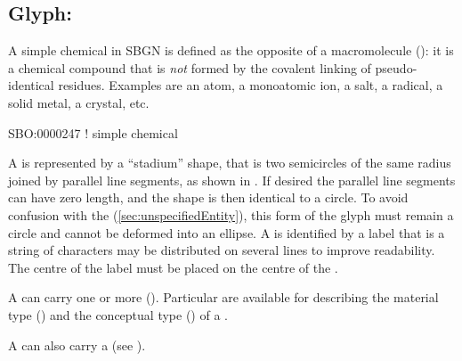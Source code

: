 \subsection{Glyph: }
\label{sec:simpleChemical}

A simple chemical in SBGN is defined as the opposite of a macromolecule (): it is a chemical compound that is \emph{not} formed by the covalent linking of pseudo-identical residues. 
Examples  are an atom, a monoatomic ion, a salt, a radical, a solid metal, a crystal, etc.

\begin{glyphDescription}

\glyphSboTerm
SBO:0000247 ! simple chemical



\glyphContainer
A  is represented by a ``stadium'' shape, that is two semicircles of the same radius joined by parallel line segments, as shown in .
If desired the parallel line segments can have zero length, and the shape is then identical to a circle.
To avoid confusion with the  (\ref{sec:unspecifiedEntity}), this form of the glyph must remain a circle and cannot be deformed into an ellipse.
\glyphLabel
A  is identified by a label  that is a string of characters  may be distributed on several lines to improve readability.
The centre of the label must be placed on the centre of the .


\glyphAux
A  can carry one or more  ().
Particular  are available for describing the material type () and the conceptual type () of a .

A  can also carry a  (see ).

\end{glyphDescription}

